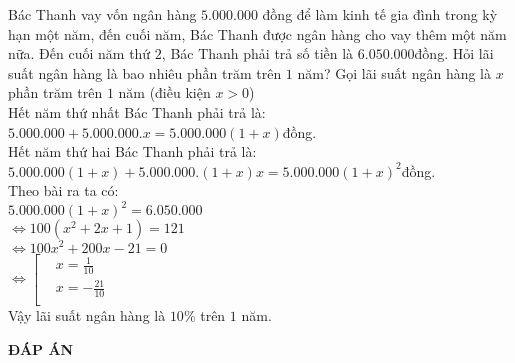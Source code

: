 \begin{ex}%
Bác Thanh vay vốn ngân hàng $5.000.000$ đồng để làm kinh tế gia đình trong kỳ hạn một năm, đến cuối năm, Bác Thanh được ngân hàng cho vay thêm một năm nữa. Đến cuối năm thứ $2$, Bác Thanh phải trả số tiền là $6.050.000$đồng. Hỏi lãi suất ngân hàng là bao nhiêu phần trăm trên $1$ năm?
\loigiai
{
	Gọi lãi suất ngân hàng là $x$ phần trăm trên $1$ năm (điều kiện $x>0$)\\
	Hết năm thứ nhất Bác Thanh phải trả là: $5.000.000+5.000.000.x=5.000.000\left( 1+x \right)$đồng. \\
	Hết năm thứ hai Bác Thanh phải trả là: $5.000.000\left( 1+x \right)+5.000.000.\left( 1+x \right)x=5.000.000{{\left( 1+x \right)}^{2}}$đồng. \\
	Theo bài ra ta có:\\
	 $5.000.000{{\left( 1+x \right)}^{2}}=6.050.000$\\
	$\Leftrightarrow 100\left( {{x}^{2}}+2x+1 \right)=121$ \\
	$\Leftrightarrow 100{{x}^{2}}+200x-21=0$ \\
	$\Leftrightarrow \left[ \begin{aligned} & x=\frac{1}{10} \\  & x=-\frac{21}{10} \\ \end{aligned} \right.$ \\
	Vậy lãi suất ngân hàng là $10$\% trên $1$ năm.
}
\end{ex}
\newpage
\begin{center}
	\textbf{ĐÁP ÁN}
\end{center}
\begin{multicols}{10}
	 
\end{multicols}
